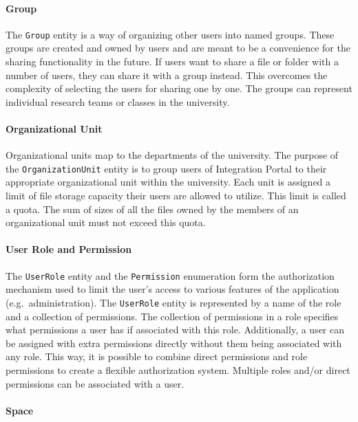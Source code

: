 \documentclass{book}
\begin{document}
\paragraph{Group}\label{group}

The \texttt{Group} entity is a way of organizing other users into named
groups. These groups are created and owned by users and are meant to be
a convenience for the sharing functionality in the future. If users want
to share a file or folder with a number of users, they can share it with
a group instead. This overcomes the complexity of selecting the users
for sharing one by one. The groups can represent individual research
teams or classes in the university.

\paragraph{Organizational Unit}\label{organizational-unit}

Organizational units map to the departments of the university. The
purpose of the \texttt{OrganizationUnit} entity is to group users of
Integration Portal to their appropriate organizational unit within the
university. Each unit is assigned a limit of file storage capacity their
users are allowed to utilize. This limit is called a quota. The sum of
sizes of all the files owned by the members of an organizational unit
must not exceed this quota.

\paragraph{User Role and Permission}\label{user-role-and-permission}

The \texttt{UserRole} entity and the \texttt{Permission} enumeration
form the authorization mechanism used to limit the user's access to
various features of the application (e.g.~administration). The
\texttt{UserRole} entity is represented by a name of the role and a
collection of permissions. The collection of permissions in a role
specifies what permissions a user has if associated with this role.
Additionally, a user can be assigned with extra permissions directly
without them being associated with any role. This way, it is possible to
combine direct permissions and role permissions to create a flexible
authorization system. Multiple roles and/or direct permissions can be
associated with a user.

\paragraph{Space}\label{space}
\end{document}
